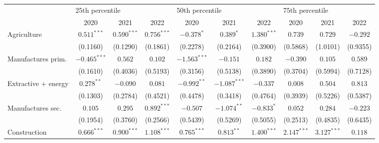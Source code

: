 \begin{tabular}{l|ccc|ccc|ccc|}
\toprule
{} & \multicolumn{3}{l}{25th percentile} & \multicolumn{3}{l}{50th percentile} & \multicolumn{3}{l}{75th percentile} \\
{} &            2020 &            2021 &            2022 &            2020 &            2021 &            2022 &            2020 &            2021 &            2022 \\
\midrule
Agriculture                      &   $0.511^{***}$ &   $0.590^{***}$ &   $0.756^{***}$ &      $-0.378^*$ &       $0.389^*$ &   $1.380^{***}$ &         $0.739$ &         $0.729$ &        $-0.292$ \\
                                 &        (0.1160) &        (0.1290) &        (0.1861) &        (0.2278) &        (0.2164) &        (0.3900) &        (0.5868) &        (1.0101) &        (0.9355) \\
Manufactures prim.               &  $-0.465^{***}$ &         $0.562$ &         $0.102$ &  $-1.563^{***}$ &        $-0.151$ &         $0.182$ &        $-0.390$ &         $0.105$ &         $0.589$ \\
                                 &        (0.1610) &        (0.4036) &        (0.5193) &        (0.3156) &        (0.5138) &        (0.3890) &        (0.3704) &        (0.5994) &        (0.7128) \\
Extractive + energy              &    $0.278^{**}$ &        $-0.090$ &         $0.081$ &   $-0.992^{**}$ &  $-1.087^{***}$ &        $-0.337$ &         $0.008$ &         $0.504$ &         $0.813$ \\
                                 &        (0.1303) &        (0.2784) &        (0.4521) &        (0.4478) &        (0.3418) &        (0.4764) &        (0.3939) &        (0.5226) &        (0.5387) \\
Manufactures sec.                &         $0.105$ &         $0.295$ &   $0.892^{***}$ &        $-0.507$ &   $-1.074^{**}$ &      $-0.833^*$ &         $0.052$ &         $0.284$ &        $-0.223$ \\
                                 &        (0.1954) &        (0.3760) &        (0.2566) &        (0.5439) &        (0.5269) &        (0.5055) &        (0.2513) &        (0.4835) &        (0.6435) \\
Construction                     &   $0.666^{***}$ &   $0.900^{***}$ &   $1.108^{***}$ &   $0.765^{***}$ &    $0.813^{**}$ &   $1.400^{***}$ &   $2.147^{***}$ &   $3.127^{***}$ &         $0.118$ \\

\end{tabular}
